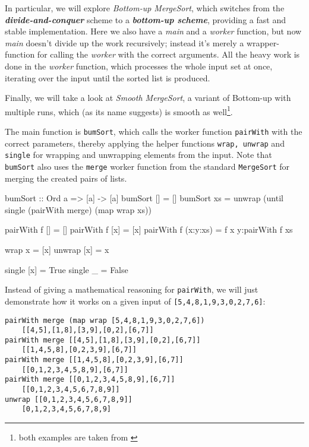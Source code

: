 In particular, we will explore \emph{Bottom-up MergeSort}, which switches from the \emph{\textbf{divide-and-conquer}} scheme to a \emph{\textbf{bottom-up scheme}}, providing a fast and stable implementation.
Here we also have a \emph{main} and a \emph{worker} function, but now \emph{main} doesn't divide up the work recursively; instead it's merely a wrapper-function for calling the \emph{worker} with the correct arguments.
All the heavy work is done in the \emph{worker} function, which processes the whole input set at once, iterating over the input until the sorted list is produced.

Finally, we will take a look at \emph{Smooth MergeSort}, a variant of Bottom-up with multiple runs, which (as its name suggests) is smooth as well\footnote{both examples are taken from \autocite[section 5.2]{adwh20}}.

\begin{impl}
The main function is \texttt{bumSort}, which calls the worker function \texttt{pairWith} with the correct parameters, thereby applying the helper functions \texttt{wrap, unwrap} and \texttt{single} for wrapping and unwrapping elements from the input.
Note that \texttt{bumSort} also uses the \texttt{merge} worker function from the standard \texttt{MergeSort} for merging the created pairs of lists.
\end{impl}

\begin{haskellcode}
  bumSort :: Ord a => [a] -> [a]
  bumSort [] = []
  bumSort xs = unwrap (until single (pairWith merge) (map wrap xs))

  pairWith f [] = []
  pairWith f [x] = [x]
  pairWith f (x:y:xs) = f x y:pairWith f xs

  wrap x = [x]
  unwrap [x] = x

  single [x]  = True
  single _    = False
\end{haskellcode}

Instead of giving a mathematical reasoning for \texttt{pairWith}, we will just demonstrate how it works on a given input of \texttt{[5,4,8,1,9,3,0,2,7,6]}:
\begin{verbatim}
pairWith merge (map wrap [5,4,8,1,9,3,0,2,7,6])
    [[4,5],[1,8],[3,9],[0,2],[6,7]]
pairWith merge [[4,5],[1,8],[3,9],[0,2],[6,7]]
    [[1,4,5,8],[0,2,3,9],[6,7]]
pairWith merge [[1,4,5,8],[0,2,3,9],[6,7]]
    [[0,1,2,3,4,5,8,9],[6,7]]
pairWith merge [[0,1,2,3,4,5,8,9],[6,7]]
    [[0,1,2,3,4,5,6,7,8,9]]
unwrap [[0,1,2,3,4,5,6,7,8,9]]
    [0,1,2,3,4,5,6,7,8,9]
\end{verbatim}

